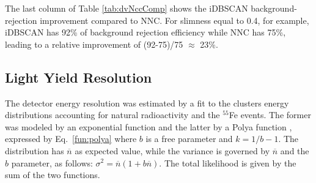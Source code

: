 \documentclass[a4paper,11pt]{article}
\begin{document}
The last column of Table \ref{tab:dvNccComp} shows the iDBSCAN background-rejection improvement compared to NNC. 
For slimness equal to 0.4, for example, iDBSCAN has 92\% of background rejection efficiency while NNC has 75\%, leading to a relative improvement of (92-75)/75 $\approx$ 23\%.



\subsection{Light Yield Resolution}\label{subsec:detres}



The detector energy resolution was estimated by a fit to the clusters energy distributions accounting for natural radioactivity and the $^{55}$Fe events. The former was modeled by an exponential function and the latter by a Polya function \cite{bib:rolandiblum}, expressed by Eq.~\ref{fun:polya} where $b$ is a free parameter and $k=1/b-1$. The distribution has $\overline{n}$ as expected value, while the variance is governed by $\overline{n}$ and the $b$ parameter, as follows: $\sigma^2=\overline{n}(1+b\overline{n})$. The total likelihood is given by the sum of the two functions.
\end{document}
